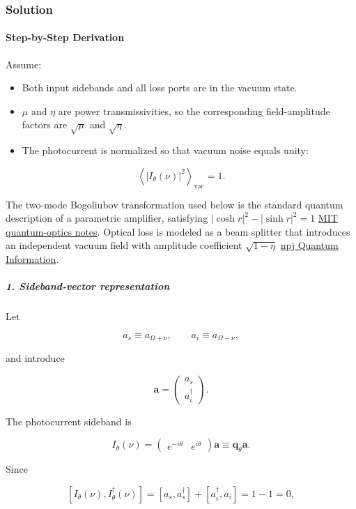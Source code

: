 \subsubsection*{Solution}
\paragraph*{Step-by-Step Derivation}

Assume:

\begin{itemize}[leftmargin=*]
\item Both input sidebands and all loss ports are in the vacuum state.
\item $\mu$ and $\eta$ are power transmissivities, so the corresponding field-amplitude factors are $\sqrt{\mu}$ and $\sqrt{\eta}$.
\item The photocurrent is normalized so that vacuum noise equals unity:
\end{itemize}
  \[
\left\langle |I_\theta(\nu)|^2\right\rangle_{\mathrm{vac}}=1.
\]

The two-mode Bogoliubov transformation used below is the standard quantum description of a parametric amplifier, satisfying $|\cosh r|^2-|\sinh r|^2=1$ \href{\detokenize{https://ocw.mit.edu/courses/6-453-quantum-optical-communication-fall-2016/f33f904ae6ac106c54ee07d21ab4cc63_MIT6_453F16_Lect12_Notes.pdf}}{MIT quantum-optics notes}. Optical loss is modeled as a beam splitter that introduces an independent vacuum field with amplitude coefficient $\sqrt{1-\eta}$ \href{\detokenize{https://www.nature.com/articles/s41534-017-0020-8}}{npj Quantum Information}.

\subparagraph*{1. Sideband-vector representation}

Let

\[
a_s\equiv a_{\Omega+\nu},\qquad a_i\equiv a_{\Omega-\nu},
\]

and introduce

\[
\mathbf{a}=
\begin{pmatrix}
a_s\\
a_i^\dagger
\end{pmatrix}.
\]

The photocurrent sideband is

\[
I_\theta(\nu)
=
\begin{pmatrix}
e^{-i\theta}&e^{i\theta}
\end{pmatrix}
\mathbf a
\equiv \mathbf q_\theta\mathbf a.
\]

Since

\[
[I_\theta(\nu),I_\theta^\dagger(\nu)] = [a_s,a_s^\dagger]+[a_i^\dagger,a_i] =1-1=0,
\]

